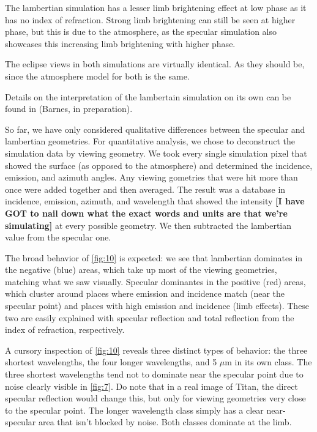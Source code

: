 \documentclass[twocolumn,linenumbers]{aastex631}
\begin{document}
The lambertian simulation has a lesser limb brightening effect at low phase as it has no index of refraction. Strong limb brightening can still be seen at higher phase, but this is due to the atmosphere, as the specular simulation also showcases this increasing limb brightening with higher phase.

The eclipse views in both simulations are virtually identical. As they should be, since the atmosphere model for both is the same.

Details on the interpretation of the lambertain simulation on its own can be found in (Barnes, in preparation). 

So far, we have only considered qualitative differences between the specular and lambertian geometries. For quantitative analysis, we chose to deconstruct the simulation data by viewing geometry. We took every single simulation pixel that showed the surface (as opposed to the atmosphere) and determined the incidence, emission, and azimuth angles. Any viewing gometries that were hit more than once were added together and then averaged. The result was a database in incidence, emission, azimuth, and wavelength that showed the intensity \textbf{\color{red}[I have GOT to nail down what the exact words and units are that we're simulating]\color{black}} at every possible geometry. We then subtracted the lambertian value from the specular one.

The broad behavior of \ref{fig:10} is expected: we see that lambertian dominates in the negative (blue) areas, which take up most of the viewing geometries, matching what we saw visually. Specular dominantes in the positive (red) areas, which cluster around places where emission and incidence match (near the specular point) and places with high emission and incidence (limb effects). These two are easily explained with specular reflection and total reflection from the index of refraction, respectively.

A cursory inspection of \ref{fig:10} reveals three distinct types of behavior: the three shortest wavelengths, the four longer wavelengths, and 5 $\mu$m in its own class. The three shortest wavelengths tend not to dominate near the specular point due to noise clearly visible in \ref{fig:7}. Do note that in a real image of Titan, the direct specular reflection would change this, but only for viewing geometries very close to the specular point. The longer wavelength class simply has a clear near-specular area that isn't blocked by noise. Both classes dominate at the limb. 
\end{document}
